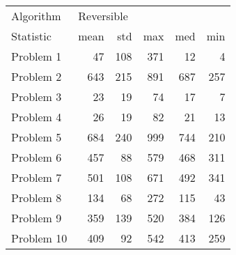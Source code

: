 \begin{tabular}{lrrrrr}
\toprule
Algorithm & \multicolumn{5}{l}{Reversible} \\
Statistic &       mean &  std &  max &  med &  min \\
\midrule
Problem 1  &         47 &  108 &  371 &   12 &    4 \\
Problem 2  &        643 &  215 &  891 &  687 &  257 \\
Problem 3  &         23 &   19 &   74 &   17 &    7 \\
Problem 4  &         26 &   19 &   82 &   21 &   13 \\
Problem 5  &        684 &  240 &  999 &  744 &  210 \\
Problem 6  &        457 &   88 &  579 &  468 &  311 \\
Problem 7  &        501 &  108 &  671 &  492 &  341 \\
Problem 8  &        134 &   68 &  272 &  115 &   43 \\
Problem 9  &        359 &  139 &  520 &  384 &  126 \\
Problem 10 &        409 &   92 &  542 &  413 &  259 \\
\bottomrule
\end{tabular}
